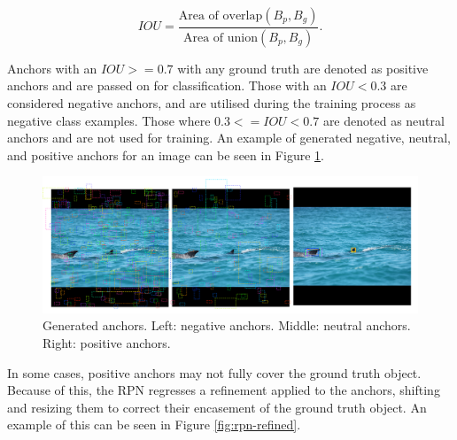 \begin{equation}
IOU = \frac{\text{Area of overlap}(B_p, B_g)}{\text{Area of union}(B_p, B_g)}.
\end{equation}

Anchors with an $IOU >= 0.7$ with any ground truth are denoted as positive anchors and are passed on for classification. Those with an $IOU < 0.3$ are considered negative anchors, and are utilised during the training process as negative class examples. Those where $0.3 <= IOU < 0.7$ are denoted as neutral anchors and are not used for training. An example of generated negative, neutral, and positive anchors for an image can be seen in Figure \ref{fig:anchor-types}.

\begin{figure}
	\begin{center}
		\includegraphics[scale=0.25]{Chapter2/figs/anchor-types.png}
	\end{center}
	\caption[Generated anchors.]{Generated anchors. Left: negative anchors. Middle: neutral anchors. Right: positive anchors.}
	\label{fig:anchor-types}
\end{figure}

In some cases, positive anchors may not fully cover the ground truth object. Because of this, the RPN regresses a refinement applied to the anchors, shifting and resizing them to correct their encasement of the ground truth object. An example of this can be seen in Figure \ref{fig:rpn-refined}.

